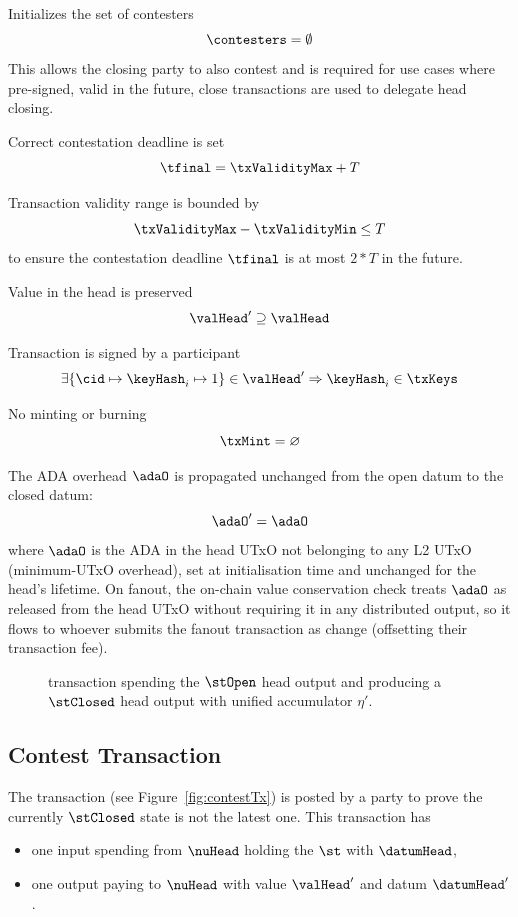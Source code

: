 \begin{menumerate}
	\item Initializes the set of contesters
	\[
		\contesters = \emptyset
	\]
	This allows the closing party to also contest and is required for use
	cases where pre-signed, valid in the future, close transactions are
	used to delegate head closing.

	\item Correct contestation deadline is set
	\[
		\tfinal = \txValidityMax + T
	\]
	\item Transaction validity range is bounded by
	\[
		\txValidityMax - \txValidityMin \leq T
	\]
	to ensure the contestation deadline $\tfinal$ is at most $2*T$ in the future.
	\item Value in the head is preserved
	\[
		\valHead' \supseteq \valHead
	\]
	\item Transaction is signed by a participant
	\[
		\exists \{\cid \mapsto \keyHash_{i} \mapsto 1\} \in \valHead' \Rightarrow \keyHash_{i} \in \txKeys
	\]
	\item No minting or burning
	\[
		\txMint = \varnothing
	\]
	\item The ADA overhead $\adaO$ is propagated unchanged from the open datum to the closed datum:
	\[
		\adaO' = \adaO
	\]
	where $\adaO$ is the ADA in the head UTxO not belonging to any L2 UTxO (minimum-UTxO overhead), set at initialisation time and unchanged for the head's lifetime. On fanout, the on-chain value conservation check treats $\adaO$ as released from the head UTxO without requiring it in any distributed output, so it flows to whoever submits the fanout transaction as change (offsetting their transaction fee).
\end{menumerate}

\begin{figure}[H]
	\centering
	
	\caption{\mtxClose{} transaction spending the $\stOpen$ head output and producing a $\stClosed$ head output with unified accumulator $\eta'$.}\label{fig:closeTx}
\end{figure}

\subsection{Contest Transaction}\label{sec:contest-tx}

The \mtxContest{} transaction (see Figure~\ref{fig:contestTx}) is posted by a
party to prove the currently $\stClosed$ state is not the latest one. This
transaction has
\begin{itemize}
	\item one input spending from $\nuHead$ holding the $\st$ with $\datumHead$,
	\item one output paying to $\nuHead$ with value $\valHead'$ and
	      datum $\datumHead'$.
\end{itemize}

